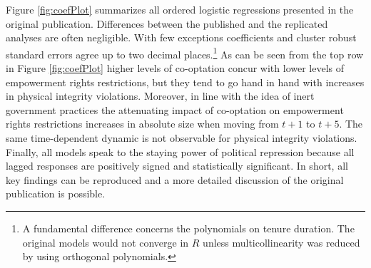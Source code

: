 Figure \ref{fig:coefPlot} summarizes all ordered logistic
regressions presented in the original publication. 
Differences between the published and the replicated 
analyses are often negligible. With few exceptions 
coefficients and cluster robust standard errors 
agree up to two decimal places.\footnote{A fundamental
difference concerns the polynomials on tenure duration. 
The original models would not converge in $R$ unless 
multicollinearity was reduced by using orthogonal 
polynomials.} As can be seen from the top row in 
Figure \ref{fig:coefPlot} higher levels of co-optation 
concur with lower levels of empowerment rights 
restrictions, but they tend to go hand in hand with 
increases in physical integrity violations. Moreover, in 
line with the idea of inert government practices the 
attenuating impact of co-optation on empowerment rights 
restrictions increases in absolute size when moving from
$t+1$ to $t+5$. The same time-dependent dynamic is not 
observable for physical integrity violations. Finally, all 
models speak to the staying power of political repression 
because all lagged responses are positively signed and
statistically significant. In short, all key findings can be 
reproduced and a more detailed discussion of the original 
publication is possible.


